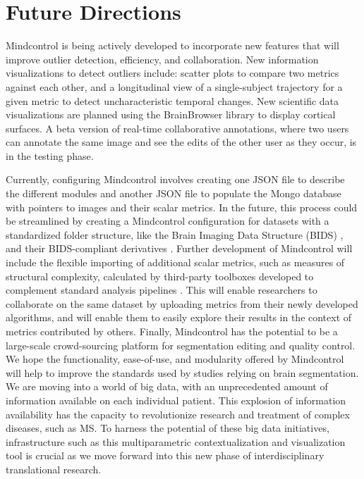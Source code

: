 \section{Future Directions}

Mindcontrol is being actively developed to incorporate new features that will improve outlier detection, efficiency, and collaboration. New information visualizations to detect outliers include: scatter plots to compare two metrics against each other, and a longitudinal view of a single-subject trajectory for a given metric to detect uncharacteristic temporal changes. New scientific data visualizations are planned using the BrainBrowser library \cite{Sherif_2015} to display cortical surfaces. A beta version of real-time collaborative annotations, where two users can annotate the same image and see the edits of the other user as they occur, is in the testing phase. 

Currently, configuring Mindcontrol involves creating one JSON file to describe the different modules and another JSON file to populate the Mongo database with pointers to images and their scalar metrics. In the future, this process could be streamlined by creating a Mindcontrol configuration for datasets with a standardized folder structure, like the Brain Imaging Data Structure (BIDS) \cite{Gorgolewski_2016}, and their BIDS-compliant derivatives \cite{gorgolewski2016bids}. Further development of Mindcontrol will include the flexible importing of additional scalar metrics, such as measures of structural complexity, calculated by third-party toolboxes developed to complement standard analysis pipelines \cite{madan2016,madan2017}. This will enable researchers to collaborate on the same dataset by uploading metrics from their newly developed algorithms, and will enable them to easily explore their results in the context of metrics contributed by others. Finally, Mindcontrol has the potential to be a large-scale crowd-sourcing platform for segmentation editing and quality control. We hope the functionality, ease-of-use, and modularity offered by Mindcontrol will help to improve the standards used by studies relying on brain segmentation. We are moving into a world of big data, with an unprecedented amount of information available on each individual patient. This explosion of information availability has the capacity to revolutionize research and treatment of complex diseases, such as MS. To harness the potential of these big data initiatives, infrastructure such as this multiparametric contextualization and visualization tool is crucial as we move forward into this new phase of interdisciplinary translational research.